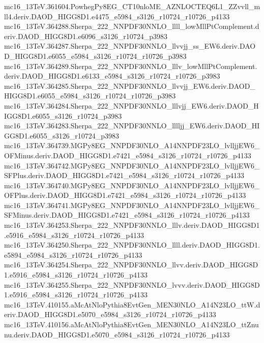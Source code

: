 \begin{footnotesize}
mc16\_13TeV.361604.PowhegPy8EG\_CT10nloME\_AZNLOCTEQ6L1\_ZZvvll\_mll4.deriv.DAOD\_HIGG8D1.e4475\_e5984\_s3126\_r10724\_r10726\_p4133 \\
mc16\_13TeV.364288.Sherpa\_222\_NNPDF30NNLO\_llll\_lowMllPtComplement.deriv.DAOD\_HIGG8D1.e6096\_s3126\_r10724\_p3983
mc16\_13TeV.364287.Sherpa\_222\_NNPDF30NNLO\_llvvjj\_ss\_EW6.deriv.DAOD\_HIGG8D1.e6055\_e5984\_s3126\_r10724\_r10726\_p3983
mc16\_13TeV.364289.Sherpa\_222\_NNPDF30NNLO\_lllv\_lowMllPtComplement.deriv.DAOD\_HIGG8D1.e6133\_e5984\_s3126\_r10724\_r10726\_p3983 \\
mc16\_13TeV.364285.Sherpa\_222\_NNPDF30NNLO\_llvvjj\_EW6.deriv.DAOD\_HIGG8D1.e6055\_e5984\_s3126\_r10724\_r10726\_p3983 \\
mc16\_13TeV.364284.Sherpa\_222\_NNPDF30NNLO\_lllvjj\_EW6.deriv.DAOD\_HIGG8D1.e6055\_s3126\_r10724\_p3983 \\
mc16\_13TeV.364283.Sherpa\_222\_NNPDF30NNLO\_lllljj\_EW6.deriv.DAOD\_HIGG8D1.e6055\_s3126\_r10724\_p3983 \\
mc16\_13TeV.364739.MGPy8EG\_NNPDF30NLO\_A14NNPDF23LO\_lvlljjEW6\_OFMinus.deriv.DAOD\_HIGG8D1.e7421\_e5984\_s3126\_r10724\_r10726\_p4133 \\
mc16\_13TeV.364742.MGPy8EG\_NNPDF30NLO\_A14NNPDF23LO\_lvlljjEW6\_SFPlus.deriv.DAOD\_HIGG8D1.e7421\_e5984\_s3126\_r10724\_r10726\_p4133 \\
mc16\_13TeV.364740.MGPy8EG\_NNPDF30NLO\_A14NNPDF23LO\_lvlljjEW6\_OFPlus.deriv.DAOD\_HIGG8D1.e7421\_e5984\_s3126\_r10724\_r10726\_p4133 \\
mc16\_13TeV.364741.MGPy8EG\_NNPDF30NLO\_A14NNPDF23LO\_lvlljjEW6\_SFMinus.deriv.DAOD\_HIGG8D1.e7421\_e5984\_s3126\_r10724\_r10726\_p4133 \\
mc16\_13TeV.364253.Sherpa\_222\_NNPDF30NNLO\_lllv.deriv.DAOD\_HIGG8D1.e5916\_e5984\_s3126\_r10724\_r10726\_p4133 \\
mc16\_13TeV.364250.Sherpa\_222\_NNPDF30NNLO\_llll.deriv.DAOD\_HIGG8D1.e5894\_e5984\_s3126\_r10724\_r10726\_p4133 \\
mc16\_13TeV.364254.Sherpa\_222\_NNPDF30NNLO\_llvv.deriv.DAOD\_HIGG8D1.e5916\_e5984\_s3126\_r10724\_r10726\_p4133 \\
mc16\_13TeV.364255.Sherpa\_222\_NNPDF30NNLO\_lvvv.deriv.DAOD\_HIGG8D1.e5916\_e5984\_s3126\_r10724\_r10726\_p4133 \\
mc16\_13TeV.410155.aMcAtNloPythia8EvtGen\_MEN30NLO\_A14N23LO\_ttW.deriv.DAOD\_HIGG8D1.e5070\_e5984\_s3126\_r10724\_r10726\_p4133 \\
mc16\_13TeV.410156.aMcAtNloPythia8EvtGen\_MEN30NLO\_A14N23LO\_ttZnunu.deriv.DAOD\_HIGG8D1.e5070\_e5984\_s3126\_r10724\_r10726\_p4133 \\

\end{footnotesize}

